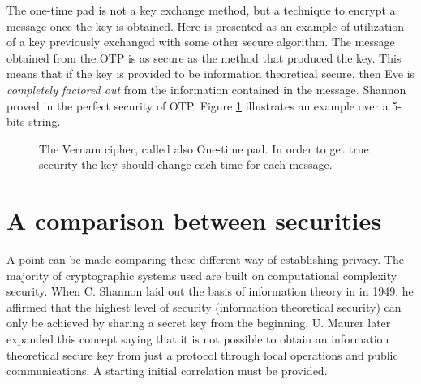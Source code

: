 		The one-time pad is not a key exchange method, but a technique to encrypt a message once the key is obtained.
		Here is presented as an example of utilization of a key previously exchanged with some other secure algorithm. 
		The message obtained from the OTP is as secure as the method that produced the key.
		This means that if the key is provided to be information theoretical secure, then Eve is \emph{completely factored out} from the information contained in the message.
		Shannon proved in \cite{Shannon49} the perfect security of OTP.
		Figure \ref{Fig:OTP} illustrates an example over a 5-bits string.
		
		\begin{figure}[h!]
			\centering
			
			\caption{The Vernam cipher, called also One-time pad. In order to get true security the key should change each time for each message.}
			\label{Fig:OTP}
		\end{figure}
\section{A comparison between securities}
    A point can be made comparing these different way of establishing privacy.
    The majority of cryptographic systems used are built on computational complexity security. 
	When C. Shannon laid out the basis of information theory in \cite{Shannon49} in 1949, he affirmed that the highest level of security (information theoretical security) can only be achieved by sharing a secret key from the beginning.
	 U. Maurer later expanded this concept saying that it is not possible to obtain an information theoretical secure key from just a protocol through local operations and public communications\cite{Maur93}. A starting initial correlation must be provided.\\
	 
